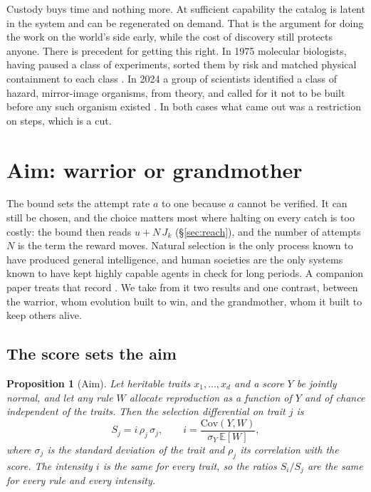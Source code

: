 \documentclass[10pt,twocolumn,letterpaper]{article}
\newtheorem{proposition}{Proposition}
\theoremstyle{definition}
\newcommand{\Ex}{\mathbb{E}}
\begin{document}
Custody buys time and nothing more. At sufficient capability the catalog is latent in the system and can be regenerated on demand. That is the argument for doing the work on the world's side early, while the cost of discovery still protects anyone. There is precedent for getting this right. In 1975 molecular biologists, having paused a class of experiments, sorted them by risk and matched physical containment to each class \cite{berg}. In 2024 a group of scientists identified a class of hazard, mirror-image organisms, from theory, and called for it not to be built before any such organism existed \cite{adamala}. In both cases what came out was a restriction on steps, which is a cut.

\section{Aim: warrior or grandmother}
\label{sec:aim}

The bound sets the attempt rate $a$ to one because $a$ cannot be verified. It can still be chosen, and the choice matters most where halting on every catch is too costly: the bound then reads $u+N\,J_{k}$ (\S\ref{sec:reach}), and the number of attempts $N$ is the term the reward moves. Natural selection is the only process known to have produced general intelligence, and human societies are the only systems known to have kept highly capable agents in check for long periods. A companion paper treats that record \cite{taylor}. We take from it two results and one contrast, between the warrior, whom evolution built to win, and the grandmother, whom it built to keep others alive.

\subsection{The score sets the aim}

\begin{proposition}[Aim]
\label{prop:aim}
Let heritable traits $x_{1},\dots,x_{d}$ and a score $Y$ be jointly normal, and let any rule $W$ allocate reproduction as a function of $Y$ and of chance independent of the traits. Then the selection differential on trait $j$ is
\[
S_{j}=i\,\rho_{j}\,\sigma_{j},\qquad i=\frac{\mathrm{Cov}(Y,W)}{\sigma_{Y}\,\Ex[W]},
\]
where $\sigma_{j}$ is the standard deviation of the trait and $\rho_{j}$ its correlation with the score. The intensity $i$ is the same for every trait, so the ratios $S_{i}/S_{j}$ are the same for every rule and every intensity.
\end{proposition}
\end{document}
